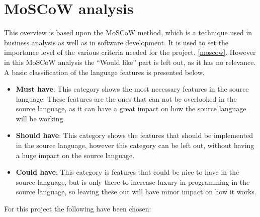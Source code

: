 \section{MoSCoW analysis}
This overview is based upon the MoSCoW method, which is a technique used in business analysis as well as in software development. It is used to set the importance level of the various criteria needed for the project. \ref{moscow}. However in this MoSCoW analysis the ``Would like'' part is left out, as it has no relevance. \\

A basic classification of the language features is presented below.
\begin{itemize}
\item \textbf{Must have}: This category shows the most necessary features in the source language. These features are the ones that can not be overlooked in the source language, as it can have a great impact on how the source language will be working. 

\item \textbf{Should have}: This category shows the features that should be implemented in the source language, however this category can be left out, without having a huge impact on the source language. 

\item \textbf{Could have}: This category is features that could be nice to have in the source language, but is only there to increase luxury in programming in the source language, so leaving these out will have minor impact on how it works. 
\end{itemize}


For this project the following have been chosen:\\

